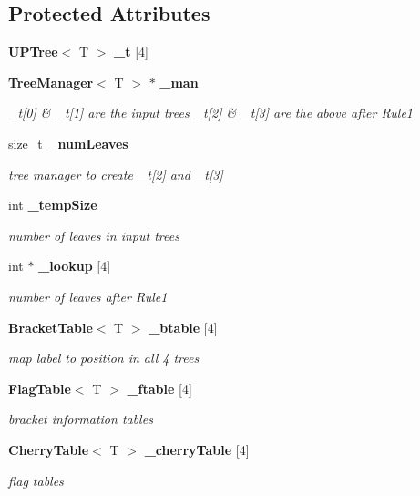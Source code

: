 \subsection*{Protected Attributes}
\begin{CompactItemize}
\item 
{\bf UPTree}$<$ T $>$ {\bf \_\-t} [4]
\item 
{\bf Tree\-Manager}$<$ T $>$ $\ast$ {\bf \_\-man}
\begin{CompactList}\small\item\em \_\-t[0] \& \_\-t[1] are the input trees \_\-t[2] \& \_\-t[3] are the above after Rule1 \item\end{CompactList}\item 
size\_\-t {\bf \_\-num\-Leaves}
\begin{CompactList}\small\item\em tree manager to create \_\-t[2] and \_\-t[3] \item\end{CompactList}\item 
int {\bf \_\-temp\-Size}
\begin{CompactList}\small\item\em number of leaves in input trees \item\end{CompactList}\item 
int $\ast$ {\bf \_\-lookup} [4]
\begin{CompactList}\small\item\em number of leaves after Rule1 \item\end{CompactList}\item 
{\bf Bracket\-Table}$<$ T $>$ {\bf \_\-btable} [4]
\begin{CompactList}\small\item\em map label to position in all 4 trees \item\end{CompactList}\item 
{\bf Flag\-Table}$<$ T $>$ {\bf \_\-ftable} [4]
\begin{CompactList}\small\item\em bracket information tables \item\end{CompactList}\item 
{\bf Cherry\-Table}$<$ T $>$ {\bf \_\-cherry\-Table} [4]
\begin{CompactList}\small\item\em flag tables \item\end{CompactList}\item 

\end{CompactItemize}
